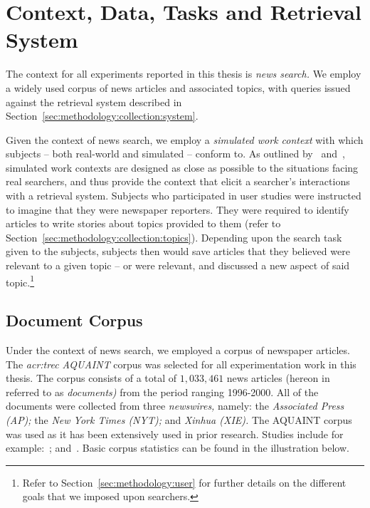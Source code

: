 
\section{Context, Data, Tasks and Retrieval System}\label{sec:methodology:collection}
The context for all experiments reported in this thesis is \emph{news search.} We employ a widely used corpus of news articles and associated topics, with queries issued against the retrieval system described in Section~\ref{sec:methodology:collection:system}.

Given the context of news search, we employ a \emph{simulated work context} with which subjects -- both real-world and simulated -- conform to. As outlined by~\cite{borlund2000simulated_work_tasks} and~\cite{li2013simulated_work_tasks}, simulated work contexts are designed as close as possible to the situations facing real searchers, and thus provide the context that elicit a searcher's interactions with a retrieval system. Subjects who participated in user studies were instructed to imagine that they were newspaper reporters. They were required to identify articles to write stories about topics provided to them (refer to Section~\ref{sec:methodology:collection:topics}). Depending upon the search task given to the subjects, subjects then would save articles that they believed were relevant to a given topic -- or were relevant, and discussed a new aspect of said topic.\footnote{Refer to Section~\ref{sec:methodology:user} for further details on the different goals that we imposed upon searchers.}

\subsection{Document Corpus}\label{sec:methodology:collection:corpus}
Under the context of news search, we employed a corpus of newspaper articles. The \emph{\gls{acr:trec} AQUAINT} corpus was selected for all experimentation work in this thesis. The corpus consists of a total of $1,033,461$ news articles (hereon in referred to as \emph{documents)} from the period ranging 1996-2000. All of the documents were collected from three \emph{newswires,} namely: the \emph{Associated Press (AP);} the \emph{New York Times (NYT);} and \emph{Xinhua (XIE).} The AQUAINT corpus was used as it has been extensively used in prior research. Studies include for example:~\cite{collinsthompson2004retrieval_quality, ofoghi2006passage_retrieval, baillie2006query_sampling, azzopardi2008retrievability, kelly2009user_study, azzopardi2013query_cost, maxwell2014temporal_delays, harvey2017searching, yang2017can}; and~\cite{wilkie2017bias}. Basic corpus statistics can be found in the illustration below.

